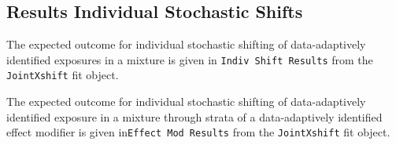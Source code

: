 \documentclass[
]{article}
\newenvironment{Shaded}{\begin{snugshade}}{\end{snugshade}}
\newcommand{\AttributeTok}[1]{\textcolor[rgb]{0.77,0.63,0.00}{#1}}
\newcommand{\FunctionTok}[1]{\textcolor[rgb]{0.00,0.00,0.00}{#1}}
\newcommand{\NormalTok}[1]{#1}
\newcommand{\OtherTok}[1]{\textcolor[rgb]{0.56,0.35,0.01}{#1}}
\newcommand{\SpecialCharTok}[1]{\textcolor[rgb]{0.00,0.00,0.00}{#1}}
\newcommand{\StringTok}[1]{\textcolor[rgb]{0.31,0.60,0.02}{#1}}
\begin{document}
\hypertarget{results-individual-stochastic-shifts}{%
\subsection{Results Individual Stochastic
Shifts}\label{results-individual-stochastic-shifts}}

The expected outcome for individual stochastic shifting of
data-adaptively identified exposures in a mixture is given in
\texttt{Indiv\ Shift\ Results} from the \texttt{JointXshift} fit object.

\begin{Shaded}
\end{Shaded}

The expected outcome for individual stochastic shifting of
data-adaptively identified exposure in a mixture through strata of a
data-adaptively identified effect modifier is given
in\texttt{Effect\ Mod\ Results} from the \texttt{JointXshift} fit object.

\begin{Shaded}
\end{Shaded}
\end{document}
